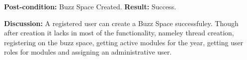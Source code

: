 \textbf{Post-condition:} Buzz Space Created. \newline
\textbf{Result:} Success. \newline
  
\textbf{Discussion:} A registered user can create a Buzz Space successfuley. Though after creation it lacks in most of the functionality, nameley thread creation, registering on the buzz space, getting active modules for the year, getting user roles for modules and assigning an administrative user.

